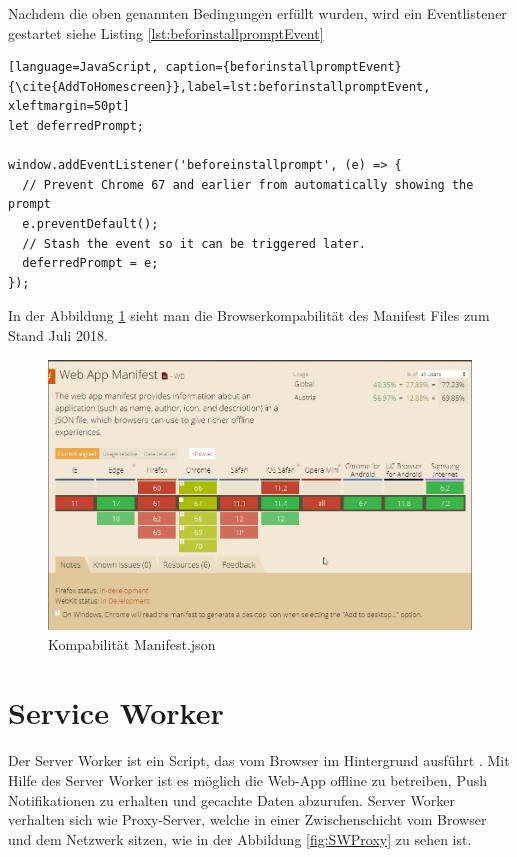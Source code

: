 Nachdem die oben genannten Bedingungen erfüllt wurden, wird ein Eventlistener gestartet siehe Listing \ref{lst:beforinstallpromptEvent}


\begin{lstlisting}[language=JavaScript, caption={beforinstallpromptEvent} {\cite{AddToHomescreen}},label=lst:beforinstallpromptEvent, xleftmargin=50pt]
let deferredPrompt;

window.addEventListener('beforeinstallprompt', (e) => {
  // Prevent Chrome 67 and earlier from automatically showing the prompt
  e.preventDefault();
  // Stash the event so it can be triggered later.
  deferredPrompt = e;
});
\end{lstlisting}

In der Abbildung \ref{fig:BrowserManifest} sieht man die Browserkompabilität des Manifest Files zum Stand Juli 2018.
 
\begin{figure}[h]
	\centering
	\includegraphics[width=16cm]{BilderAllgemein/BrowserManifest}\medskip
	\caption{Kompabilität Manifest.json \cite{BrowserSupport}}
	\label{fig:BrowserManifest}
\end{figure}
 

\newpage
\section{Service Worker}\label{sub:ServiceWorker}
Der Server Worker ist ein Script, das vom Browser im Hintergrund ausführt \cite{ServiceWorkerRegistration}. Mit Hilfe des Server Worker ist es möglich die \acs{Web-App} offline zu betreiben, Push Notifikationen zu erhalten und gecachte Daten abzurufen. Server Worker verhalten sich wie Proxy-Server, welche in einer Zwischenschicht vom Browser und dem Netzwerk sitzen, wie in der Abbildung \ref{fig:SWProxy} zu sehen ist.

